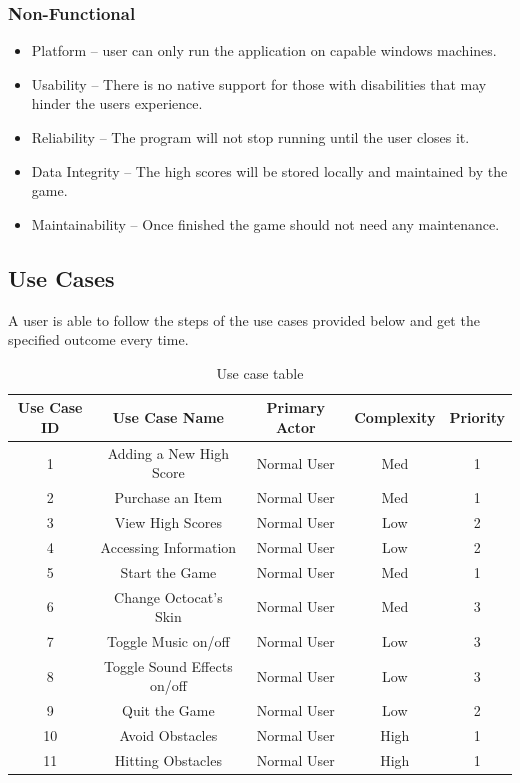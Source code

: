 \documentclass[10pt,conference,onecolumn,compsoc]{IEEEtran}
\begin{document}
\subsubsection{Non-Functional}
\begin{itemize}
\item Platform -- user can only run the application on capable windows machines.
\item Usability -- There is no native support for those with disabilities that may hinder the users experience.
\item Reliability -- The program will not stop running until the user closes it.
\item Data Integrity -- The high scores will be stored locally and maintained by the game.
\item Maintainability -- Once finished the game should not need any maintenance.
\end{itemize}

\subsection{Use Cases}

A user is able to follow the steps of the use cases provided below and get the specified outcome every time.

\begin{table}[hp]
\centering
\begin{tabular}{|c|c|c|c|c|}
\hline
Use Case ID & Use Case Name & Primary Actor & Complexity & Priority \\
\hline \hline
1 & Adding a New High Score & Normal User & Med & 1\\
\hline
2 & Purchase an Item & Normal User & Med & 1\\
\hline
3 & View High Scores & Normal User & Low & 2\\
\hline
4 & Accessing Information & Normal User & Low & 2\\
\hline
5 & Start the Game & Normal User & Med & 1\\
\hline
6 & Change Octocat's Skin & Normal User & Med & 3\\
\hline
7 & Toggle Music on/off & Normal User & Low & 3\\
\hline
8 & Toggle Sound Effects on/off& Normal User & Low & 3\\
\hline
9 & Quit the Game & Normal User & Low & 2\\
\hline
10 & Avoid Obstacles & Normal User & High & 1\\
\hline
11 & Hitting Obstacles & Normal User & High & 1\\
\hline

\end{tabular}
\caption{Use case table}
\label{tab:useCaseIndex}
\end{table}
\end{document}
